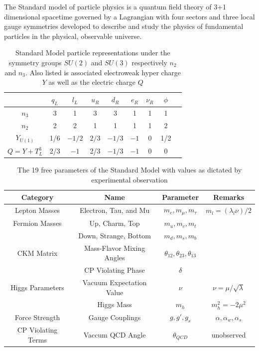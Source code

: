 The Standard model of particle physics is a quantum field theory of 3+1 dimensional 
spacetime governed by a Lagrangian with four sectors and three local gauge symmetries
developed to describe and study the physics of fundamental particles in the physical, observable universe.  
\begin{center}
\begin{table}[]
\begin{center}
\caption{Standard Model particle representations under the symmetry groups $SU(2)$ and $SU(3)$ respectively $n_2$ and $n_3$. Also listed is associated electroweak hyper charge $Y$ as well as the electric charge $Q$ }
\begin{tabular}{ccccccccc}
                & $q_L$ & $l_L$  & $u_R$ & $d_R$  & $e_R$ & $\nu_R$ & $\phi$ \\
\hline
$n_3$           & 3     & 1      & 3     & 3      & 1     & 1  & 1     \\
$n_2$           & 2     & 2      & 1     & 1      & 1     & 1  & 2     \\
$Y_{U(1)}$      & 1/6   & $-1/2$ & $2/3$ & $-1/3$ & $-1$  & 0  & 1/2     \\
\hline
\hline
$Q = Y + T_L^3$ & 2/3   & $-1$ & 2/3   & $-1/3$ & $-1$  & 0 & 0
\end{tabular}
\end{center}
\label{tab:charges} 
\end{table}
\end{center}


\begin{center}
\begin{table}[]
\begin{center}
\caption{The 19 free parameters of the Standard Model with values as dictated by experimental observation}
\begin{tabular}{cccc}
\textbf{Category} & \textbf{Name} & \textbf{Parameter} & \textbf{Remarks} \\
\hline
Lepton Masses & Electron, Tau, and Mu  & $m_e,m_\mu,m_\tau$ & $m_l = (\lambda_l \nu)/2$ \\
Fermion Masses & Up, Charm, Top & $m_u, m_c, m_t$ & \\ 
   & Down, Strange, Bottom & $m_d, m_s, m_b$ & \\
\hline
CKM Matrix & Mass-Flavor Mixing Angles & $\theta_{12},\theta_{23},\theta_{13}$ & \\ 
 & CP Violating Phase  & $\delta$ & \\ 
\hline
Higgs Parameters & Vacuum Expectation Value &  $\nu$ & $\nu= \mu / \sqrt{\lambda}$   \\
& Higgs Mass & $m_{h}$ &   $m_h^2 = -2\mu^2$  \\
\hline
Force Strength & Gauge Couplings & $g, g', g_s$ & $\alpha, \alpha_w, \alpha_s$  \\ 
\hline
CP Violating Terms & Vaccum QCD Angle  & $\theta_{QCD}$ &  unobserved \\
\hline
\end{tabular}
\end{center}
\label{tab:free_params}
\end{table}
\end{center}
